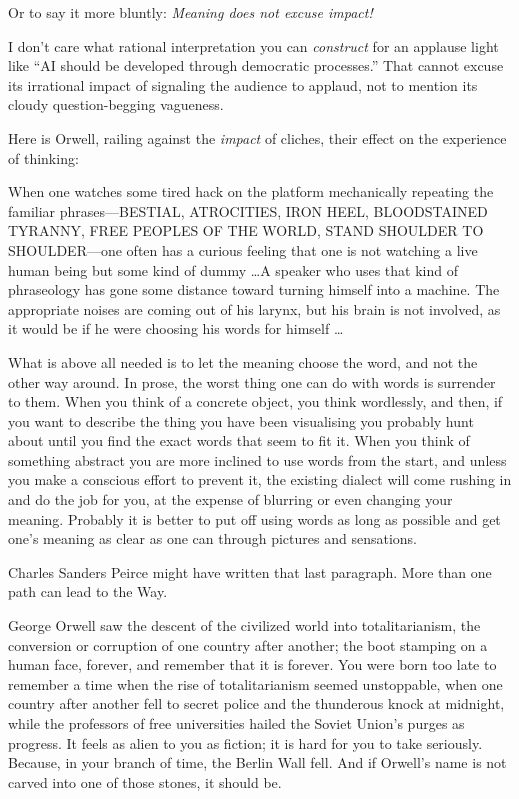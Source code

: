 {
 Or to say it more bluntly: \textit{Meaning does not excuse
impact!}}

{
 I don't care what rational interpretation you can
\textit{construct} for an applause light like ``AI
should be developed through democratic processes.''
That cannot excuse its irrational impact of signaling the audience to
applaud, not to mention its cloudy question-begging vagueness.}

{
 Here is Orwell, railing against the \textit{impact} of cliches,
their effect on the experience of thinking:}

{
 When one watches some tired hack on the platform mechanically
repeating the familiar phrases---BESTIAL, ATROCITIES, IRON HEEL,
BLOODSTAINED TYRANNY, FREE PEOPLES OF THE WORLD, STAND SHOULDER TO
SHOULDER---one often has a curious feeling that one is not watching a
live human being but some kind of dummy \ldots A speaker who uses that
kind of phraseology has gone some distance toward turning himself into
a machine. The appropriate noises are coming out of his larynx, but his
brain is not involved, as it would be if he were choosing his words for
himself \ldots}

{
 What is above all needed is to let the meaning choose the word,
and not the other way around. In prose, the worst thing one can do with
words is surrender to them. When you think of a concrete object, you
think wordlessly, and then, if you want to describe the thing you have
been visualising you probably hunt about until you find the exact words
that seem to fit it. When you think of something abstract you are more
inclined to use words from the start, and unless you make a conscious
effort to prevent it, the existing dialect will come rushing in and do
the job for you, at the expense of blurring or even changing your
meaning. Probably it is better to put off using words as long as
possible and get one's meaning as clear as one can
through pictures and sensations.}

{
 Charles Sanders Peirce might have written that last paragraph.
More than one path can lead to the Way.}

\myendsectiontext


\bigskip


{
 George Orwell saw the descent of the civilized world into
totalitarianism, the conversion or corruption of one country after
another; the boot stamping on a human face, forever, and remember that
it is forever. You were born too late to remember a time when the rise
of totalitarianism seemed unstoppable, when one country after another
fell to secret police and the thunderous knock at midnight, while the
professors of free universities hailed the Soviet
Union's purges as progress. It feels as alien to you as
fiction; it is hard for you to take seriously. Because, in your branch
of time, the Berlin Wall fell. And if Orwell's name is
not carved into one of those stones, it should be. }

